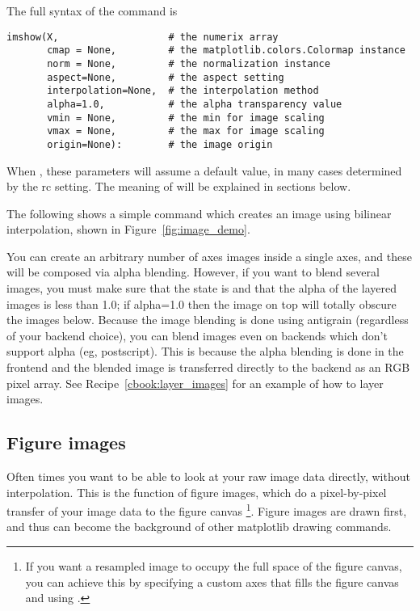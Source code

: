 \documentclass[twoside]{book}
\begin{document}
The full syntax of the  command is

\begin{lstlisting}
imshow(X,                   # the numerix array
       cmap = None,         # the matplotlib.colors.Colormap instance
       norm = None,         # the normalization instance
       aspect=None,         # the aspect setting
       interpolation=None,  # the interpolation method
       alpha=1.0,           # the alpha transparency value
       vmin = None,         # the min for image scaling 
       vmax = None,         # the max for image scaling
       origin=None):        # the image origin

\end{lstlisting}

When , these parameters will assume a default value, in
many cases determined by the rc setting.  The meaning of  will be explained in sections below.

The following shows a simple command which creates an image using
bilinear interpolation, shown in Figure~\ref{fig:image_demo}.




You can create an arbitrary number of axes images inside a single
axes, and these will be composed via alpha blending.  However, if you
want to blend several images, you must make sure that the
 state is  and that the alpha of the
layered images is less than 1.0; if alpha=1.0 then the image on top
will totally obscure the images below.  Because the image blending is
done using antigrain (regardless of your backend choice), you can
blend images even on backends which don't support alpha (eg,
postscript).  This is because the alpha blending is done in the
frontend and the blended image is transferred directly to the backend
as an RGB pixel array.  See Recipe~\ref{cbook:layer_images} for an example of
how to layer images.


\subsection{Figure images}
\label{sec:image_figure}
Often times you want to be able to look at your raw image data
directly, without interpolation.  This is the function of figure
images, which do a pixel-by-pixel transfer of your image data to the
figure canvas \footnote{If you want a resampled image to occupy the
  full space of the figure canvas, you can achieve this by specifying
  a custom axes that fills the figure canvas  and using .}.  Figure images are drawn first,
and thus can become the background of other matplotlib drawing
commands.
\end{document}
